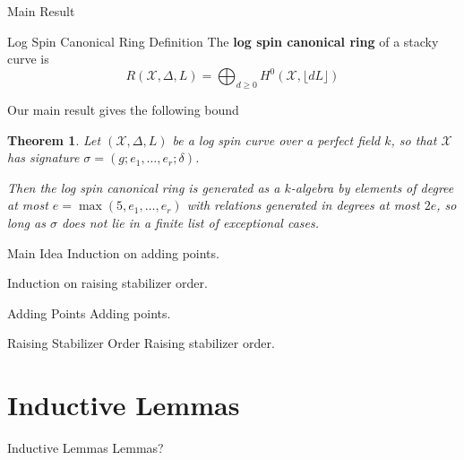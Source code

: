 \documentclass{beamer}
\newtheorem{thm}{Theorem}
\theoremstyle{remark}
\newcommand \sx{{\mathscr X}}
\newcommand{\halfcan}{L}
\begin{document}
\begin{frame}{Main Result}
\begin{alertblock}{Log Spin Canonical Ring Definition}
The \textbf{log spin canonical ring} of a stacky curve is
\[
	R(\sx, \Delta, \halfcan) = \bigoplus_{d \geq 0} H^0(\sx, \lfloor d \halfcan \rfloor)
\]
\end{alertblock}

Our main result gives the following bound

\pause
\begin{thm}
\label{thm:main}
Let $(\sx, \Delta, \halfcan)$ be a log spin curve over a perfect
field $k$, so that $\sx$ has signature $\sigma = (g; e_1, \ldots,
e_r; \delta)$.

Then the log spin canonical ring is generated as a $k$-algebra by 
elements of degree at most $e = \max(5, e_1, \ldots, e_r)$ with
relations generated in degrees at most $2e$,
so long as $\sigma$ does not lie in a finite list of exceptional
cases.
\end{thm}

\end{frame}


\begin{frame}{Main Idea}
Induction on adding points.

Induction on raising stabilizer order.

\end{frame}


\begin{frame}{Adding Points}
Adding points.

\end{frame}


\begin{frame}{Raising Stabilizer Order}
Raising stabilizer order.

\end{frame}

\section{Inductive Lemmas} 

\begin{frame}{Inductive Lemmas}
Lemmas?

\end{frame}
\end{document}
